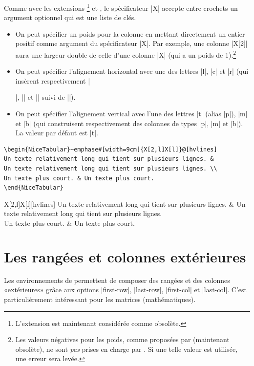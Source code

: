 \documentclass[dvipsnames]{article}%
\begin{document}
Comme avec les extensions \footnote{L'extension  est
  maintenant considérée comme obsolète.} et , le spécificateur |X|
accepte entre crochets un argument optionnel qui est une liste de clés.
\begin{itemize}
\item On peut spécifier un poids pour la colonne en mettant directement un
entier positif comme argument du spécificateur |X|. Par exemple, une colonne
|X[2]| aura une largeur double de celle d'une colonne |X| (qui a un poids de
1).\footnote{Les valeurs négatives pour les poids, comme proposées par
   (maintenant obsolète), ne sont \emph{pas} prises en charge par
  . Si une telle valeur est utilisée, une erreur sera levée.}
\item On peut spécifier l'alignement horizontal avec une des lettres |l|, |c| et
|r| (qui insèrent respectivement |\raggedright|, |\centering| et |\raggedleft|
suivi de |\arraybackslash|).
\item On peut spécifier l'alignement vertical avec l'une des lettres |t| (alias
|p|), |m| et |b| (qui construisent respectivement des colonnes de types |p|, |m|
et |b|). La valeur par défaut est |t|.
\end{itemize}

\begin{Verbatim}
\begin{NiceTabular}~emphase#[width=9cm]{X[2,l]X[l]}@[hvlines]
Un texte relativement long qui tient sur plusieurs lignes. &
Un texte relativement long qui tient sur plusieurs lignes. \\
Un texte plus court. & Un texte plus court.
\end{NiceTabular}
\end{Verbatim}


\begin{center}
\begin{NiceTabular}[width=9cm]{X[2,l]X[l]}[hvlines]
Un texte relativement long qui tient sur plusieurs lignes. &
Un texte relativement long qui tient sur plusieurs lignes. \\
Un texte plus court. & Un texte plus court.
\end{NiceTabular}
\end{center}

\medskip
\section{Les rangées et colonnes extérieures}
Les environnements de  permettent de composer des rangées et des
colonnes «extérieures» grâce aux options |first-row|, |last-row|, |first-col| et
|last-col|. C'est particulièrement intéressant pour les matrices (mathématiques).
\label{exterior}
\end{document}
